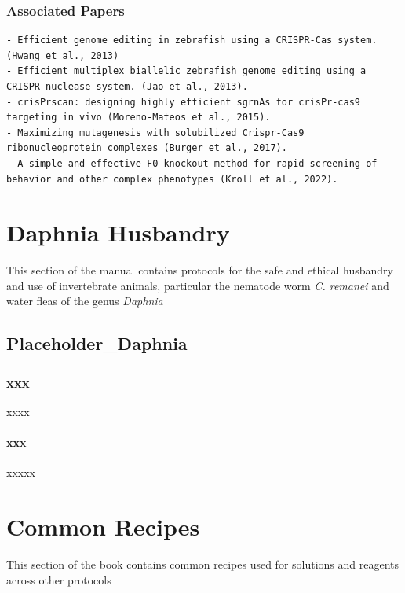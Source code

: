 \documentclass[
  letterpaper,
  DIV=11,
  numbers=noendperiod]{scrreprt}
\begin{document}
\hypertarget{associated-papers-60}{%
\section{Associated Papers}\label{associated-papers-60}}

\begin{verbatim}
- Efficient genome editing in zebrafish using a CRISPR-Cas system. (Hwang et al., 2013)
- Efficient multiplex biallelic zebrafish genome editing using a CRISPR nuclease system. (Jao et al., 2013). 
- crisPrscan: designing highly efficient sgrnAs for crisPr-cas9 targeting in vivo (Moreno-Mateos et al., 2015). 
- Maximizing mutagenesis with solubilized Crispr-Cas9 ribonucleoprotein complexes (Burger et al., 2017). 
- A simple and effective F0 knockout method for rapid screening of behavior and other complex phenotypes (Kroll et al., 2022). 
\end{verbatim}

\part{Daphnia Husbandry}

This section of the manual contains protocols for the safe and ethical
husbandry and use of invertebrate animals, particular the nematode worm
\emph{C. remanei} and water fleas of the genus \emph{Daphnia}

\hypertarget{sec-Daphnia}{%
\chapter{Placeholder\_Daphnia}\label{sec-Daphnia}}

\hypertarget{xxx-2}{%
\section{xxx}\label{xxx-2}}

xxxx

\hypertarget{xxx-3}{%
\subsection{xxx}\label{xxx-3}}

xxxxx

\part{Common Recipes}

This section of the book contains common recipes used for solutions and
reagents across other protocols
\end{document}
